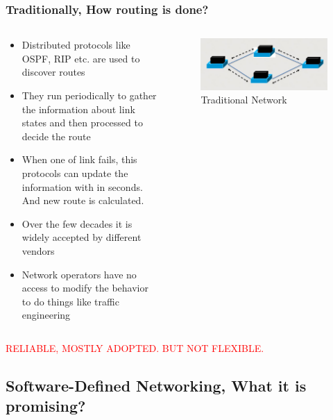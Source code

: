 \documentclass{beamer}
\begin{document}
\begin{frame}
\frametitle{Traditionally, How routing is done?}
\begin{columns}[T] %
	\begin{column}[T]{7.5cm} 
		\begin{itemize}
			\item Distributed protocols like OSPF, RIP etc. are used to discover routes
			\item They run periodically to gather the information about link states and then processed to decide the route
			\item When one of link fails, this protocols can update the information with in seconds. And new route is calculated.
			\item Over the few decades it is widely accepted by different vendors
			\item Network operators have no access to modify the behavior to do things like traffic engineering
		\end{itemize}
	\end{column}
	\begin{column}[T]{5cm} 
		\begin{figure}
			\includegraphics[scale=0.25]{1}
			\caption{Traditional Network}
		\end{figure}
	\end{column}
\end{columns}
\medskip
\textcolor{red}{RELIABLE, MOSTLY ADOPTED. BUT NOT FLEXIBLE.}
\end{frame}

\subsection{Software-Defined Networking, What it is promising?}
\end{document}
